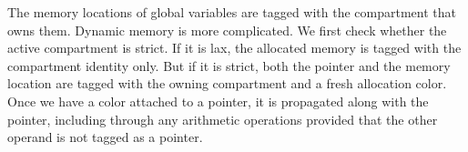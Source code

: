 \documentclass{article}
\begin{document}
\begin{minipage}{0.49\textwidth}
\end{minipage}
\begin{minipage}{0.49\textwidth}
  \rettruleblock{\(\PCT['] := \PCT[_{CLR}]\)}
\end{minipage}

The memory locations of global variables are tagged with the compartment that owns them.
Dynamic memory is more complicated. We first check whether the active compartment is strict.
If it is lax, the allocated memory is tagged with the compartment identity only. But if it is
strict, both the pointer and the memory location are tagged with the owning compartment and
a fresh allocation color. Once we have a color attached to a pointer, it is propagated along
with the pointer, including through any arithmetic operations provided that the other operand
is not tagged as a pointer.
\end{document}
